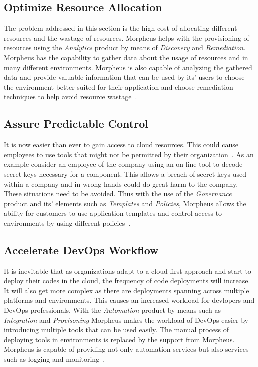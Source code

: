 \subsection{Optimize Resource Allocation}

The problem addressed in this section is the high cost of allocating different
resources and the wastage of resources. Morpheus helps with the provisioning of
resources using the \textit{Analytics} product by means of \textit{Discovery}
and \textit{Remediation}. Morpheus has the capability to gather data about the
usage of resources and in many different environments. Morpheus is also capable
of analyzing the gathered data and provide valuable information that can be
used by its' users to choose the environment better suited for their
application and choose remediation techniques to help avoid resource
wastage~\cite{hid-sp18-416-www-morpheus-product-guide}.

\subsection{Assure Predictable Control}

It is now easier than ever to gain access to cloud resources. This could cause
employees to use tools that might not be permitted by their
organization~\cite{hid-sp18-416-www-shadowit-wikipedia}. As an example consider
an employee of the company using an on-line tool to decode secret keys
necessary for a component. This allows a breach of secret keys used within a
company and in wrong hands could do great harm to the company. These situations
need to be avoided. Thus with the use of the \textit{Governance} product and
its' elements such as \textit{Templates} and \textit{Policies}, Morpheus allows
the ability for customers to use application templates and control access to
environments by using different
policies~\cite{hid-sp18-416-www-morpheus-product-guide}.

\subsection{Accelerate DevOps Workflow}

It is inevitable that as organizations adapt to a cloud-first approach and
start to deploy their codes in the cloud, the frequency of code deployments
will increase. It will also get more complex as there are deployments spanning
across multiple platforms and environments. This causes an increased workload
for devlopers and DevOps professionals. With the \textit{Automation} product by
means such as \textit{Integration} and \textit{Provisoning} Morpheus makes the
workload of DevOps easier by introducing multiple tools that can be used
easily. The manual process of deploying tools in environments is replaced by
the support from Morpheus. Morpheus is capable of providing not only automation
services but also services such as logging and
monitoring~\cite{hid-sp18-416-www-morpheus-product-guide}.

